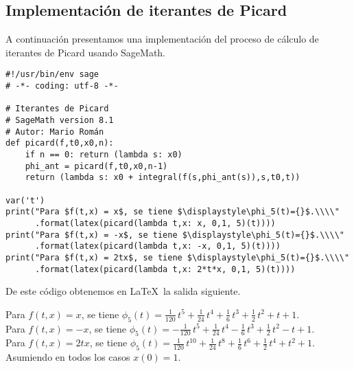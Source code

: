 \documentclass[11pt]{article}
\theoremstyle{plain}
\theoremstyle{definition}
\theoremstyle{remark}
\begin{document}
\begin{appendices}
\section{Implementación de iterantes de Picard}
A continuación presentamos una implementación del proceso de cálculo
de iterantes de Picard usando SageMath.

\begin{verbatim}
#!/usr/bin/env sage
# -*- coding: utf-8 -*-

# Iterantes de Picard
# SageMath version 8.1
# Autor: Mario Román
def picard(f,t0,x0,n):
    if n == 0: return (lambda s: x0)
    phi_ant = picard(f,t0,x0,n-1)
    return (lambda s: x0 + integral(f(s,phi_ant(s)),s,t0,t))

var('t')
print("Para $f(t,x) = x$, se tiene $\displaystyle\phi_5(t)={}$.\\\\"
      .format(latex(picard(lambda t,x: x, 0,1, 5)(t))))
print("Para $f(t,x) = -x$, se tiene $\displaystyle\phi_5(t)={}$.\\\\"
      .format(latex(picard(lambda t,x: -x, 0,1, 5)(t))))
print("Para $f(t,x) = 2tx$, se tiene $\displaystyle\phi_5(t)={}$.\\\\"      
      .format(latex(picard(lambda t,x: 2*t*x, 0,1, 5)(t))))
\end{verbatim}

De este código obtenemos en \LaTeX\ la salida siguiente.

Para $f(t,x) = x$, se tiene $\displaystyle\phi_5(t)=\frac{1}{120} \, t^{5} + \frac{1}{24} \, t^{4} + \frac{1}{6} \, t^{3} + \frac{1}{2} \, t^{2} + t + 1$.\\
Para $f(t,x) = -x$, se tiene $\displaystyle\phi_5(t)=-\frac{1}{120} \, t^{5} + \frac{1}{24} \, t^{4} - \frac{1}{6} \, t^{3} + \frac{1}{2} \, t^{2} - t + 1$.\\
Para $f(t,x) = 2tx$, se tiene $\displaystyle\phi_5(t)=\frac{1}{120} \, t^{10} + \frac{1}{24} \, t^{8} + \frac{1}{6} \, t^{6} + \frac{1}{2} \, t^{4} + t^{2} + 1$.\\

Asumiendo en todos los casos $x(0) = 1$.
\end{appendices}
\end{document}
